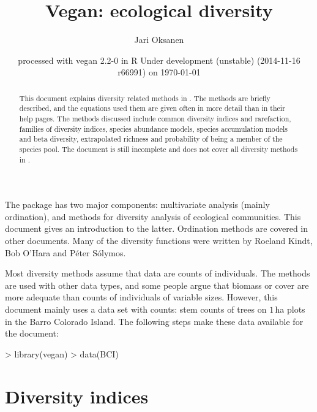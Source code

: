 \documentclass[a4paper,10pt,twocolumn]{article}
\title{Vegan: ecological diversity} \author{Jari Oksanen}
\date{\footnotesize{
  processed with vegan 2.2-0
  in R Under development (unstable) (2014-11-16 r66991) on \today}}
\begin{document}




\maketitle
\begin{abstract} 
  This document explains diversity related methods in
  . The methods are briefly described, and the equations
  used them are given often in more detail than in their help
  pages. The methods discussed include common diversity indices and
  rarefaction, families of diversity indices, species abundance
  models, species accumulation models and beta diversity, extrapolated
  richness and probability of being a member of the species pool. The
  document is still incomplete and does not cover all diversity
  methods in .
\end{abstract}
\tableofcontents


\noindent The  package has two major components:
multivariate analysis (mainly ordination), and methods for diversity
analysis of ecological communities.  This document gives an
introduction to the latter.  Ordination methods are covered in other
documents.  Many of the diversity functions were written by Roeland
Kindt, Bob O'Hara and P{\'e}ter S{\'o}lymos.

Most diversity methods assume that data are counts of individuals.
The methods are used with other data types, and some people argue that
biomass or cover are more adequate than counts of individuals of
variable sizes.  However, this document mainly uses a data set with
counts: stem counts of trees on $1$\,ha plots in the Barro Colorado
Island.  The following steps make these data available for the
document:
\begin{Schunk}
\begin{Sinput}
> library(vegan)
> data(BCI)
\end{Sinput}
\end{Schunk}

\section{Diversity indices}
\end{document}
